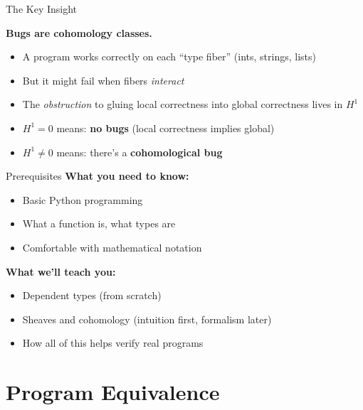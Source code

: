 \documentclass[aspectratio=169,11pt]{beamer}
\newcommand{\Hone}{H^1}
\begin{document}
\begin{frame}{The Key Insight}
\begin{center}
\Large
\textbf{Bugs are cohomology classes.}
\end{center}

\vspace{1em}
\begin{itemize}
\item A program works correctly on each ``type fiber'' (ints, strings, lists)
\item But it might fail when fibers \emph{interact}
\item The \emph{obstruction} to gluing local correctness into global
  correctness lives in $\Hone$
\item $\Hone = 0$ means: \textbf{no bugs} (local correctness implies global)
\item $\Hone \neq 0$ means: there's a \textbf{cohomological bug}
\end{itemize}
\end{frame}

\begin{frame}{Prerequisites}
\textbf{What you need to know:}
\begin{itemize}
\item Basic Python programming
\item What a function is, what types are
\item Comfortable with mathematical notation
\end{itemize}

\vspace{1em}
\textbf{What we'll teach you:}
\begin{itemize}
\item Dependent types (from scratch)
\item Sheaves and cohomology (intuition first, formalism later)
\item How all of this helps verify real programs
\end{itemize}
\end{frame}



\part{Program Equivalence}
\end{document}
